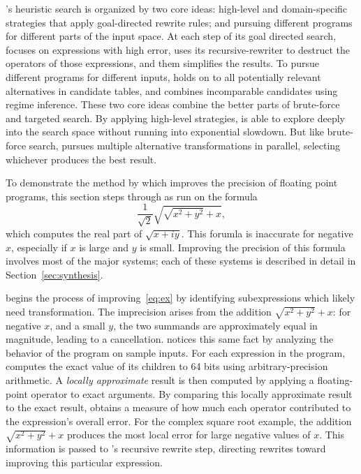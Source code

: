 \documentclass[paper.tex]{subfiles}
\begin{document}
\casio's heuristic search is organized by two core ideas: high-level
and domain-specific strategies that apply goal-directed rewrite rules;
and pursuing different programs for different parts of the input
space.  At each step of its goal directed search, \casio focuses on
expressions with high error, uses its recursive-rewriter to destruct
the operators of those expressions, and them simplifies the results.
To pursue different programs for different inputs, \casio holds on to
all potentially relevant alternatives in candidate tables, and combines
incomparable candidates using regime inference.  These two core ideas
combine the better parts of brute-force and targeted search.  By
applying high-level strategies, \casio is able to explore deeply into
the search space without running into exponential slowdown.  But like
brute-force search, \casio pursues multiple alternative
transformations in parallel, selecting whichever produces the best
result.

To demonstrate the method by which
  \casio improves the precision of floating point programs,
  this section steps through \casio as run on the formula
\begin{equation}\label{eq:ex}
  \frac1{\sqrt2} \sqrt{\sqrt{x^2 + y^2} + x},
\end{equation}
  which computes the real part of $\sqrt{x + i y}$.
This forumla is inaccurate for negative $x$,
  especially if $x$ is large and $y$ is small.
Improving the precision of this formula
  involves most of the major systems;
  each of these systems is described in detail
  in Section~\ref{sec:synthesis}.

\casio begins the process of improving~\eqref{eq:ex}
  by identifying subexpressions
  which likely need transformation.
The imprecision arises from the addition $\sqrt{x^2 + y^2} + x$:
  for negative $x$, and a small $y$,
  the two summands are approximately equal in magnitude,
  leading to a cancellation.
\casio notices this same fact
  by analyzing the behavior of the program on sample inputs.
For each expression in the program,
  \casio computes the exact value of its children to 64 bits
  using arbitrary-precision arithmetic.
A \emph{locally approximate} result is then computed
  by applying a floating-point operator to exact arguments.
By comparing this locally approximate result to the exact result,
  \casio obtains a measure of how much each operator
  contributed to the expression's overall error.
For the complex square root example,
  the addition $\sqrt{x^2 + y^2} + x$ produces the most local error
  for large negative values of $x$.
This information is passed to \casio's recursive rewrite step,
  directing rewrites toward improving this particular expression.
\end{document}
